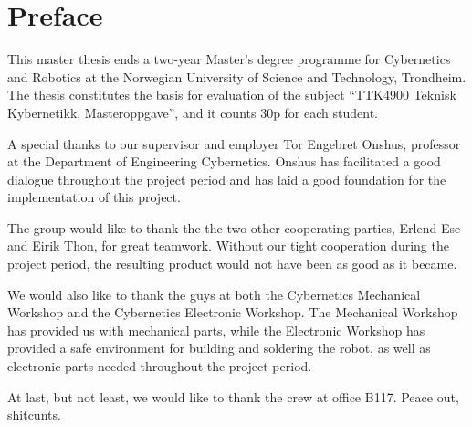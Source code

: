 \chapter*{Preface}

This master thesis ends a two-year Master's degree programme for Cybernetics and Robotics at the Norwegian University of Science and Technology, Trondheim. The thesis constitutes the basis for evaluation of the subject ``TTK4900 Teknisk Kybernetikk, Masteroppgave'', and it counts 30p for each student.

A special thanks to our supervisor and employer Tor Engebret Onshus, professor at the Department of Engineering Cybernetics. Onshus has facilitated a good dialogue throughout the project period and has laid a good foundation for the implementation of this project.

The group would like to thank the the two other cooperating parties, Erlend Ese and Eirik Thon, for great teamwork. Without our tight cooperation during the project period, the resulting product would not have been as good as it became.

We would also like to thank the guys at both the Cybernetics Mechanical Workshop and the Cybernetics Electronic Workshop. The Mechanical Workshop has provided us with mechanical parts, while the Electronic Workshop has provided a safe environment for building and soldering the robot, as well as electronic parts needed throughout the project period.

At last, but not least, we would like to thank the crew at office B117. Peace out, shitcunts. 